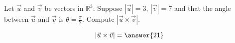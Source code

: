 \documentclass{ximera}
\author{Gregory Hartman \and Matthew Carr}
\begin{document}
\begin{exercise}



Let $\vec{u}$ and $\vec{v}$ be vectors in $\mathbb{R}^3$. Suppose $|\vec{u}|=3$, $|\vec{v}|=7$ and that the angle between $\vec{u}$ and $\vec{v}$ is $\theta=\frac{\pi}{2}$. Compute $|\vec{u}\times\vec{v}|$.

\begin{prompt}
\[
|\vec{u}\times\vec{v}|=\answer{21}
\]
\end{prompt}


\end{exercise}
\end{document}
